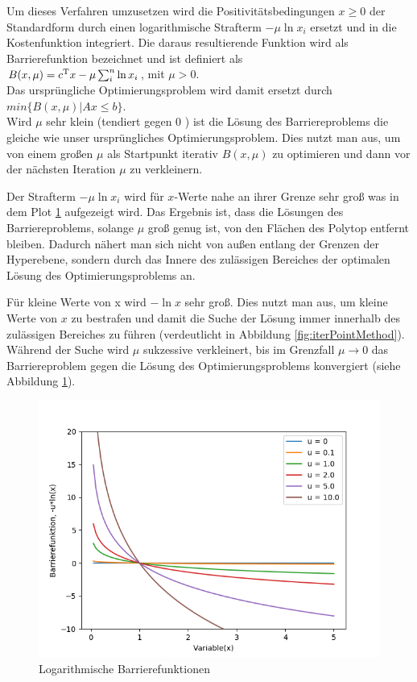 \documentclass{like}
\begin{document}
Um dieses Verfahren umzusetzen wird die Positivitätsbedingungen $x \geq 0$ der Standardform durch einen logarithmische Strafterm $-\mu \ln x_i $  ersetzt und in die Kostenfunktion integriert. Die daraus resultierende Funktion wird als Barrierefunktion bezeichnet und ist definiert als \\
$B(x,\mu) =  c\textsuperscript{T}x - \mu \sum_{i}^{n} \ln x_i$, mit $\mu > 0$. \\
Das ursprüngliche Optimierungsproblem wird damit ersetzt durch 
$min \{B(x,\mu) | Ax \leq b\}$.\\
Wird \(\mu\) sehr klein (tendiert gegen \(0\) ) ist die Lösung des Barriereproblems die gleiche wie unser ursprüngliches Optimierungsproblem. Dies nutzt man aus, um von einem großen \(\mu\) als Startpunkt iterativ $B(x,\mu)$ zu optimieren und dann vor der nächsten Iteration \(\mu\) zu verkleinern.


Der Strafterm $-\mu \ln x_i $ wird für $x$-Werte nahe an ihrer Grenze sehr groß was in dem Plot \ref{fig:iterPointLn} aufgezeigt wird. Das Ergebnis ist, dass die Lösungen des Barriereproblems, solange $\mu$ groß genug ist, von den Flächen des Polytop entfernt bleiben.
Dadurch nähert man sich nicht von außen entlang der Grenzen der Hyperebene, sondern durch das Innere des zulässigen Bereiches der optimalen Lösung des Optimierungsproblems an. 

Für kleine Werte von x wird $-\ln x $ sehr groß. Dies nutzt man aus, um kleine Werte von \(x\) zu bestrafen und damit die Suche der Lösung immer innerhalb des zulässigen Bereiches zu führen (verdeutlicht in Abbildung \ref{fig:iterPointMethod}). Während der Suche wird \(\mu\) sukzessive verkleinert, bis im Grenzfall $ \mu \rightarrow 0$ das Barriereproblem gegen die Lösung des Optimierungsproblems konvergiert (siehe Abbildung \ref{fig:iterPointLn}).\\

\begin{figure}[ht!]
	\centering
	\includegraphics[width=350pt]{Abbildungen/intPointLn.png}
	\caption{Logarithmische Barrierefunktionen}
	\label{fig:iterPointLn}
\end{figure}
\end{document}

